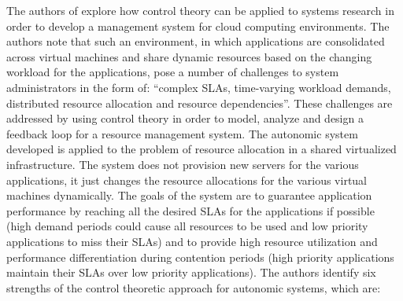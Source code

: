 The authors of \cite{related:control} explore how control theory can be applied to systems research in order to develop a management system for cloud computing environments. The authors note that such an environment, in which applications are consolidated across virtual machines and share dynamic resources based on the changing workload for the applications, pose a number of challenges to system administrators in the form of: ``complex SLAs, time-varying workload demands, distributed resource allocation and resource dependencies''. These challenges are addressed by using control theory in order to model, analyze and design a feedback loop for a resource management system. The autonomic system developed is applied to the problem of resource allocation in a shared virtualized infrastructure. The system does not provision new servers for the various applications, it just changes the resource allocations for the various virtual machines dynamically. The goals of the system are to guarantee application performance by reaching all the desired SLAs for the applications if possible (high demand periods could cause all resources to be used and low priority applications to miss their SLAs) and to provide high resource utilization and performance differentiation during contention periods (high priority applications maintain their SLAs over low priority applications). The authors identify six strengths of the control theoretic approach for autonomic systems, which are:

